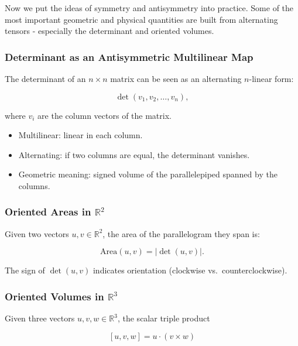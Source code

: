 \documentclass[
  letterpaper,
  DIV=11,
  numbers=noendperiod]{scrreprt}
\providecommand{\tightlist}{%
  \setlength{\itemsep}{0pt}\setlength{\parskip}{0pt}}
\begin{document}
Now we put the ideas of symmetry and antisymmetry into practice. Some of
the most important geometric and physical quantities are built from
alternating tensors - especially the determinant and oriented volumes.

\subsubsection{Determinant as an Antisymmetric Multilinear
Map}\label{determinant-as-an-antisymmetric-multilinear-map}

The determinant of an \(n \times n\) matrix can be seen as an
alternating \(n\)-linear form:

\[
\det(v_1, v_2, \dots, v_n),
\]

where \(v_i\) are the column vectors of the matrix.

\begin{itemize}
\tightlist
\item
  Multilinear: linear in each column.
\item
  Alternating: if two columns are equal, the determinant vanishes.
\item
  Geometric meaning: signed volume of the parallelepiped spanned by the
  columns.
\end{itemize}

\subsubsection{\texorpdfstring{Oriented Areas in
\(\mathbb{R}^2\)}{Oriented Areas in \textbackslash mathbb\{R\}\^{}2}}\label{oriented-areas-in-mathbbr2}

Given two vectors \(u, v \in \mathbb{R}^2\), the area of the
parallelogram they span is:

\[
\mathrm{Area}(u,v) = | \det(u,v) |.
\]

The sign of \(\det(u,v)\) indicates orientation (clockwise
vs.~counterclockwise).

\subsubsection{\texorpdfstring{Oriented Volumes in
\(\mathbb{R}^3\)}{Oriented Volumes in \textbackslash mathbb\{R\}\^{}3}}\label{oriented-volumes-in-mathbbr3}

Given three vectors \(u,v,w \in \mathbb{R}^3\), the scalar triple
product

\[
[u,v,w] = u \cdot (v \times w)
\]
\end{document}
